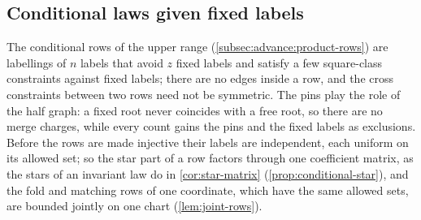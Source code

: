 \subsection{Conditional laws given fixed labels}\label{subsec:push:pinnedremainder}

The conditional rows of the upper range (\cref{subsec:advance:product-rows}) are
labellings of $n$ labels that avoid $z$ fixed labels and satisfy a few square-class
constraints against fixed labels; there are no edges inside a row, and the cross
constraints between two rows need not be symmetric. The pins play the role of the
half graph: a fixed root never coincides with a free root, so there are no merge
charges, while every count gains the pins and the fixed labels as exclusions. Before
the rows are made injective their labels are independent, each uniform on its allowed
set; so the star part of a row factors through one coefficient matrix, as the stars of
an invariant law do in \cref{cor:star-matrix} (\cref{prop:conditional-star}), and the
fold and matching rows of one coordinate, which have the same allowed sets, are
bounded jointly on one chart (\cref{lem:joint-rows}).


